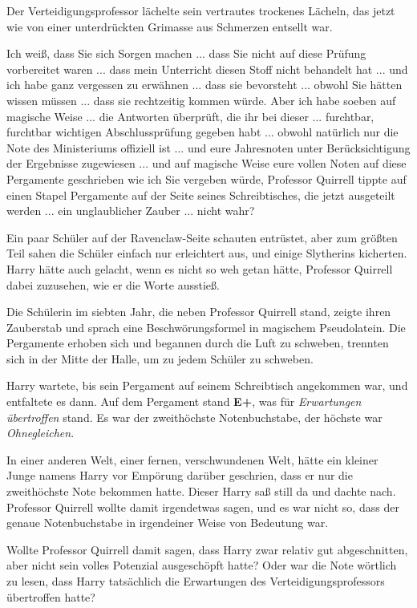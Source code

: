 Der Verteidigungsprofessor lächelte sein vertrautes trockenes Lächeln, das jetzt
wie von einer unterdrückten Grimasse aus Schmerzen entsellt war.

\glqq{}Ich weiß, dass Sie sich Sorgen machen ... dass Sie nicht auf diese Prüfung
vorbereitet waren ... dass mein Unterricht diesen Stoff nicht behandelt hat ...
und ich habe ganz vergessen zu erwähnen ... dass sie bevorsteht ... obwohl Sie
hätten wissen müssen ... dass sie rechtzeitig kommen würde. Aber ich habe soeben
auf magische Weise ... die Antworten überprüft, die ihr bei dieser ... furchtbar,
furchtbar wichtigen Abschlussprüfung gegeben habt ... obwohl natürlich nur die
Note des Ministeriums offiziell ist ... und eure Jahresnoten unter
Berücksichtigung der Ergebnisse zugewiesen ... und auf magische Weise eure vollen
Noten auf diese Pergamente geschrieben wie ich Sie vergeben würde\grqq{},
Professor Quirrell tippte auf einen Stapel Pergamente auf der Seite seines
Schreibtisches, \glqq{}die jetzt ausgeteilt werden ... ein unglaublicher Zauber ...
nicht wahr?\grqq{}

Ein paar Schüler auf der Ravenclaw-Seite schauten entrüstet, aber zum größten
Teil sahen die Schüler einfach nur erleichtert aus, und einige Slytherins
kicherten. Harry hätte auch gelacht, wenn es nicht so weh getan hätte, Professor
Quirrell dabei zuzusehen, wie er die Worte ausstieß.

Die Schülerin im siebten Jahr, die neben Professor Quirrell stand, zeigte ihren
Zauberstab und sprach eine Beschwörungsformel in magischem Pseudolatein. Die
Pergamente erhoben sich und begannen durch die Luft zu schweben, trennten sich
in der Mitte der Halle, um zu jedem Schüler zu schweben.

Harry wartete, bis sein Pergament auf seinem Schreibtisch angekommen war, und
entfaltete es dann. Auf dem Pergament stand \textbf{E+}, was für
\emph{Erwartungen übertroffen} stand. Es war der zweithöchste Notenbuchstabe,
der höchste war \emph{Ohnegleichen}.

In einer anderen Welt, einer fernen, verschwundenen Welt, hätte ein kleiner
Junge namens Harry vor Empörung darüber geschrien, dass er nur die zweithöchste
Note bekommen hatte. Dieser Harry saß still da und dachte nach. Professor
Quirrell wollte damit irgendetwas sagen, und es war nicht so, dass der genaue
Notenbuchstabe in irgendeiner Weise von Bedeutung war.

Wollte Professor Quirrell damit sagen, dass Harry zwar relativ gut
abgeschnitten, aber nicht sein volles Potenzial ausgeschöpft hatte? Oder war die
Note wörtlich zu lesen, dass Harry tatsächlich die Erwartungen des
Verteidigungsprofessors übertroffen hatte?

